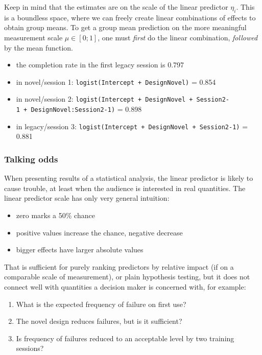 \documentclass[]{svmono}
\providecommand{\tightlist}{%
  \setlength{\itemsep}{0pt}\setlength{\parskip}{0pt}}
\begin{document}
Keep in mind that the estimates are on the scale of the linear predictor
\(\eta_i\). This is a boundless space, where we can freely create linear
combinations of effects to obtain group means. To get a group mean
prediction on the more meaningful measurement scale \(\mu \in [0;1]\),
one must \emph{first} do the linear combination, \emph{followed} by the
mean function.

\begin{itemize}
\tightlist
\item
  the completion rate in the first legacy session is 0.797
\item
  in novel/session 1: \texttt{logist(Intercept\ +\ DesignNovel)} = 0.854
\item
  in novel/session 2:
  \texttt{logist(Intercept\ +\ DesignNovel\ +\ Session2-1\ +\ DesignNovel:Session2-1)}
  = 0.898
\item
  in legacy/session 3:
  \texttt{logist(Intercept\ +\ DesignNovel\ +\ Session2-1)} = 0.881
\end{itemize}

\subsubsection{Talking odds}\label{talking-odds}

When presenting results of a statistical analysis, the linear predictor
is likely to cause trouble, at least when the audience is interested in
real quantities. The linear predictor scale has only very general
intuition:

\begin{itemize}
\tightlist
\item
  zero marks a 50\% chance
\item
  positive values increase the chance, negative decrease
\item
  bigger effects have larger absolute values
\end{itemize}

That is sufficient for purely ranking predictors by relative impact (if
on a comparable scale of measurement), or plain hypothesis testing, but
it does not connect well with quantities a decision maker is concerned
with, for example:

\begin{enumerate}
\def\labelenumi{\arabic{enumi}.}
\tightlist
\item
  What is the expected frequency of failure on first use?
\item
  The novel design reduces failures, but is it sufficient?
\item
  Is frequency of failures reduced to an acceptable level by two
  training sessions?
\end{enumerate}
\end{document}
